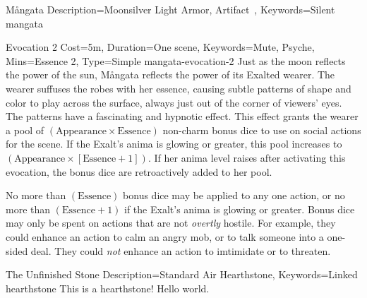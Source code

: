 \begin{Merit}{Mångata}{
    Description={Moonsilver Light Armor, Artifact~},
    Keywords=Silent
}{mangata}
\begin{Charm}{Evocation 2}{
    Cost=5m,
    Duration=One scene,
    Keywords={Mute, Psyche},
    Mins=Essence 2,
    Type=Simple
}{mangata-evocation-2}
Just as the moon reflects the power of the sun, Mångata reflects the power of
its Exalted wearer. The wearer suffuses the robes with her essence, causing
subtle patterns of shape and color to play across the surface, always just out
of the corner of viewers' eyes. The patterns have a fascinating and hypnotic
effect. This effect grants the wearer a pool of $(\mathrm{Appearance} \times
\mathrm{Essence})$ non-charm bonus dice to use on social actions for the scene.
If the Exalt's anima is glowing or greater, this pool increases to
$(\mathrm{Appearance} \times [\mathrm{Essence} + 1])$. If her anima level
raises after activating this evocation, the bonus dice are retroactively added
to her pool.

No more than $(\mathrm{Essence})$ bonus dice may be applied to any one action,
or no more than $(\mathrm{Essence} + 1)$ if the Exalt's anima is glowing or
greater. Bonus dice may only be spent on actions that are not \emph{overtly}
hostile. For example, they could enhance an action to calm an angry mob, or to
talk someone into a one-sided deal. They could \emph{not} enhance an action to
imtimidate or to threaten.
\end{Charm}
\end{Merit}

\begin{Merit}{The Unfinished Stone}{
    Description=Standard Air Hearthstone,
    Keywords=Linked
}{hearthstone}
This is a hearthstone! Hello world.
\end{Merit}


